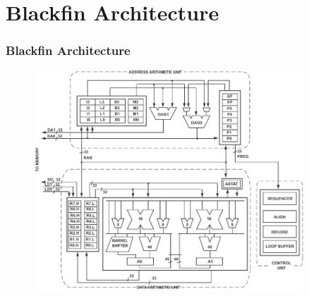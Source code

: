 \section{Blackfin Architecture}
\begin{frame} \frametitle{Blackfin Architecture}
    \begin{figure}[htbp]
      \centering
      \includegraphics[width=0.9\textwidth]{img/bf537_internal}
      \label{fig:bf537_internal}
    \end{figure}
\end{frame}


